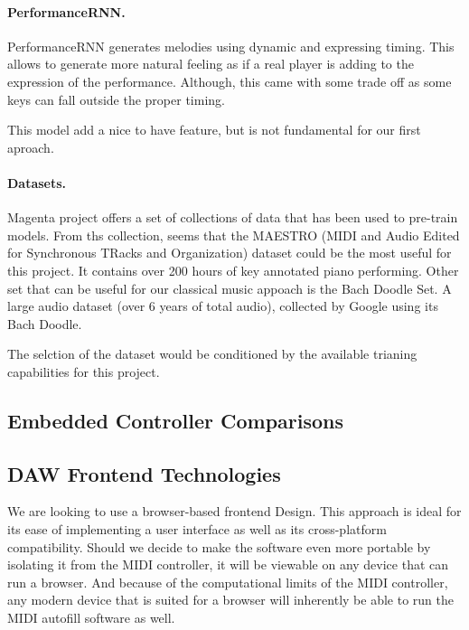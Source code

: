 \paragraph{PerformanceRNN.}
PerformanceRNN generates melodies using dynamic and expressing timing. This allows to
generate more natural feeling as if a real player is adding to the expression of the
performance. Although, this came with some trade off as some keys can fall outside the
proper timing. \autocite{performanceRNN}

This model add a nice to have feature, but is not fundamental for our first aproach.

\paragraph{Datasets.}
Magenta project offers a set of collections of data that has been used to pre-train
models. From ths collection, seems that the MAESTRO (MIDI and Audio Edited for Synchronous
TRacks and Organization) dataset could be the most useful for this project. It contains
over 200 hours of key annotated piano performing. Other set that can be useful for our
classical music appoach is the Bach Doodle Set. A large audio dataset (over 6 years of
total audio), collected by Google using its Bach Doodle. \autocite{magentaData}

The selction of the dataset would be conditioned by the available trianing capabilities
for this project.


\subsection{Embedded Controller Comparisons}
\label{sec:embedded_controllers}

\blindtext

\subsection{DAW Frontend Technologies}

We are looking to use a browser-based frontend Design. This approach is ideal for its ease
of implementing a user interface as well as its cross-platform compatibility. Should we
decide to make the software even more portable by isolating it from the MIDI controller,
it will be viewable on any device that can run a browser. And because of the computational
limits of the MIDI controller, any modern device that is suited for a browser will
inherently be able to run the MIDI autofill software as well.

